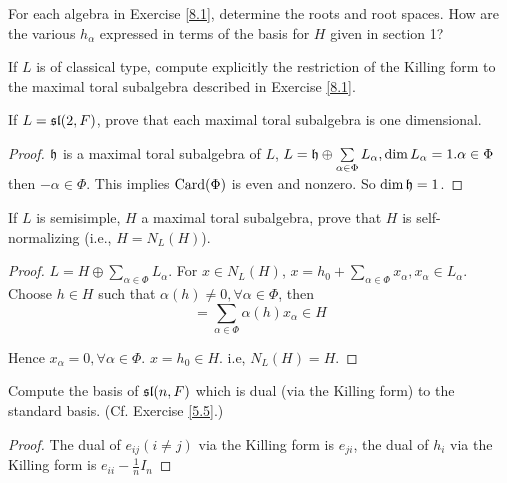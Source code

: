 \begin{ex}\label{8.2}
  For each algebra in Exercise \ref{8.1}, determine the roots and root spaces. How are the various $h_{\alpha}$ expressed in terms of the basis for $H$ given in section 1?
\end{ex}

\begin{ex}
  If $L$ is of classical type, compute explicitly the restriction of the Killing form to the maximal toral subalgebra described in Exercise \ref{8.1}.
\end{ex}

\begin{ex}
  If $L = \sl(2,F)$, prove that each maximal toral subalgebra is one dimensional.
\end{ex}
\begin{proof}
  $\hh$ is a maximal toral subalgebra of $L$, $L = \hh \oplus\sum\limits_{\alpha\in\Phi} L_{\alpha}, \dim L_{\alpha} = 1. \alpha\in\Phi$ then $-\alpha\in\Phi$. This implies $\Card(\Phi)$ is even and nonzero. So $\dim \hh = 1$.
\end{proof}

\begin{ex}
  If $L$ is semisimple, $H$ a maximal toral subalgebra, prove that $H$ is self-normalizing (i.e., $H = N_L(H)$).
\end{ex}
\begin{proof}
  $L = H \oplus\sum\limits_{\alpha\in\Phi} L_{\alpha}$. For $x\in N_L(H)$, $x= h_0+\sum\limits_{\alpha\in\Phi} x_{\alpha}, x_{\alpha}\in L_{\alpha}$. Choose $h \in H$ such that $\alpha(h) \neq 0, \forall\alpha\in\Phi$, then
  \begin{equation*}
    [h, x] = \sum_{\alpha\in\Phi} \alpha(h)x_{\alpha} \in H
  \end{equation*}

  Hence $x_{\alpha} = 0, \forall \alpha\in\Phi$. $x = h_0 \in H$. i.e, $N_L(H) = H$.
\end{proof}

\begin{ex}
  Compute the basis of $\sl(n,F)$ which is dual (via the Killing form) to the standard basis. (Cf. Exercise \ref{5.5}.)
\end{ex}
\begin{proof}
  The dual of $e_{ij}(i\neq j)$ via the Killing form is $e_{ji}$, the dual of $h_i$ via the Killing form is $e_{ii}-\frac{1}{n}I_n$
\end{proof}

